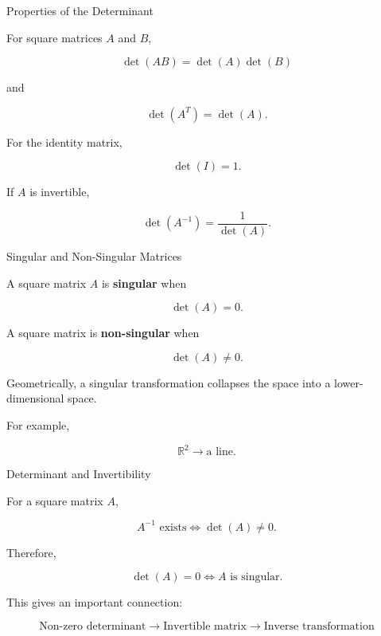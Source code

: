 
\begin{frame}{Properties of the Determinant}

For square matrices $A$ and $B$,

\[
\boxed{
\det(AB)=\det(A)\det(B)
}
\]

and

\[
\boxed{
\det(A^T)=\det(A).
}
\]

For the identity matrix,

\[
\boxed{
\det(I)=1.
}
\]

If $A$ is invertible,

\[
\boxed{
\det(A^{-1})
=
\frac{1}{\det(A)}.
}
\]

\end{frame}



\begin{frame}{Singular and Non-Singular Matrices}

A square matrix $A$ is \textbf{singular} when

\[
\boxed{
\det(A)=0.
}
\]

A square matrix is \textbf{non-singular} when

\[
\boxed{
\det(A)\neq0.
}
\]

\vspace{0.4cm}

Geometrically, a singular transformation collapses the
space into a lower-dimensional space.

\vspace{0.3cm}

For example,

\[
\mathbb{R}^2
\longrightarrow
\text{a line}.
\]

\end{frame}



\begin{frame}{Determinant and Invertibility}

For a square matrix $A$,

\[
\boxed{
A^{-1}\text{ exists}
\iff
\det(A)\neq0.
}
\]

Therefore,

\[
\boxed{
\det(A)=0
\iff
A\text{ is singular}.
}
\]

\vspace{0.4cm}

This gives an important connection:

\[
\boxed{
\text{Non-zero determinant}
\rightarrow
\text{Invertible matrix}
\rightarrow
\text{Inverse transformation}
}
\]

\end{frame}


